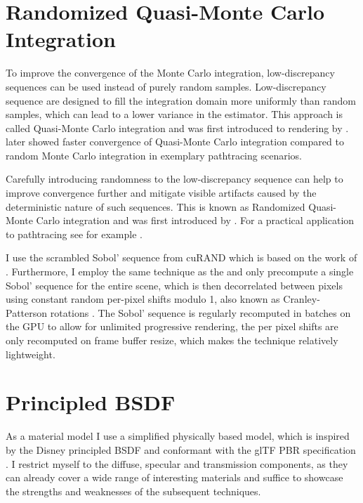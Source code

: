 \section{Randomized Quasi-Monte Carlo Integration}

To improve the convergence of the Monte Carlo integration, low-discrepancy sequences can be used instead of purely random samples.
Low-discrepancy sequence are designed to fill the integration domain more uniformly than random samples, which can lead to a lower variance in the estimator.
This approach is called Quasi-Monte Carlo integration and was first introduced to rendering by \textcite{heinrich1994a}.
\textcite{keller1996a} later showed faster convergence of Quasi-Monte Carlo integration compared to random Monte Carlo integration in exemplary pathtracing scenarios.

Carefully introducing randomness to the low-discrepancy sequence can help to improve convergence further and mitigate visible artifacts caused by the deterministic nature of such sequences.
This is known as Randomized Quasi-Monte Carlo integration and was first introduced by \textcite{owen1995}.
For a practical application to pathtracing see for example \textcite{burley2020}.

I use the scrambled Sobol' sequence from cuRAND \parencite{nvidiacorporation2024} which is based on the work of \textcite{owen2008}.
Furthermore, I employ the same technique as the \textcite{blenderfoundation} and only precompute a single Sobol' sequence for the entire scene, which is then decorrelated between pixels using constant random per-pixel shifts modulo 1, also known as Cranley-Patterson rotations \parencite{cranley1976}.
The Sobol' sequence is regularly recomputed in batches on the GPU to allow for unlimited progressive rendering, the per pixel shifts are only recomputed on frame buffer resize, which makes the technique relatively lightweight.

\section{Principled BSDF}

As a material model I use a simplified physically based model, which is inspired by the Disney principled BSDF \parencite{burley2012} and conformant with the glTF PBR specification \parencite{thekhronosr3dformatsworkinggroup2021}.
I restrict myself to the diffuse, specular and transmission components, as they can already cover a wide range of interesting materials and suffice to showcase the strengths and weaknesses of the subsequent techniques.

